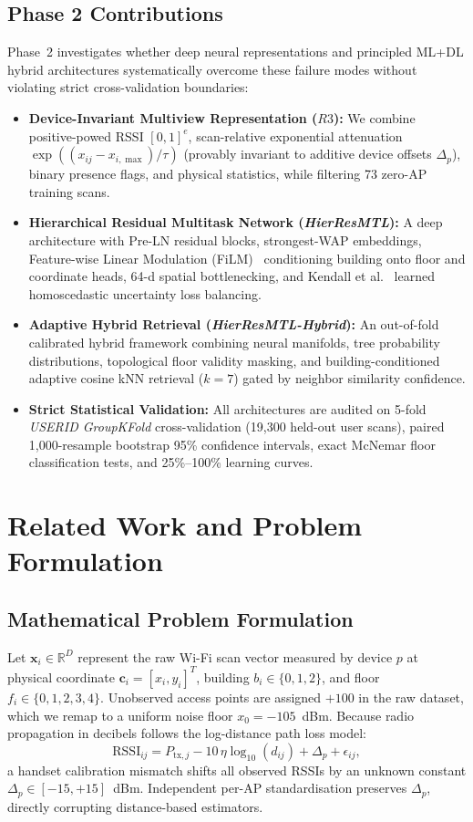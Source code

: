 \documentclass[conference]{IEEEtran}
\begin{document}
\subsection{Phase 2 Contributions}
Phase~2 investigates whether deep neural representations and principled ML+DL hybrid architectures systematically overcome these failure modes without violating strict cross-validation boundaries:
\begin{itemize}
    \item \textbf{Device-Invariant Multiview Representation ($R3$):} We combine positive-powed RSSI $[0, 1]^e$, scan-relative exponential attenuation $\exp((x_{ij} - x_{i,\max})/\tau)$ (provably invariant to additive device offsets $\Delta_p$), binary presence flags, and physical statistics, while filtering 73 zero-AP training scans.
    \item \textbf{Hierarchical Residual Multitask Network (\textit{HierResMTL}):} A deep architecture with Pre-LN residual blocks, strongest-WAP embeddings, Feature-wise Linear Modulation (FiLM)~\cite{perez2018film} conditioning building onto floor and coordinate heads, 64-d spatial bottlenecking, and Kendall et al.~\cite{kendall2018multi} learned homoscedastic uncertainty loss balancing.
    \item \textbf{Adaptive Hybrid Retrieval (\textit{HierResMTL-Hybrid}):} An out-of-fold calibrated hybrid framework combining neural manifolds, tree probability distributions, topological floor validity masking, and building-conditioned adaptive cosine kNN retrieval ($k=7$) gated by neighbor similarity confidence.
    \item \textbf{Strict Statistical Validation:} All architectures are audited on 5-fold \textit{USERID GroupKFold} cross-validation (19,300 held-out user scans), paired 1,000-resample bootstrap 95\% confidence intervals, exact McNemar floor classification tests, and 25\%--100\% learning curves.
\end{itemize}

\section{Related Work and Problem Formulation}

\subsection{Mathematical Problem Formulation}
Let $\mathbf{x}_i \in \mathbb{R}^{D}$ represent the raw Wi-Fi scan vector measured by device $p$ at physical coordinate $\mathbf{c}_i = [x_i, y_i]^T$, building $b_i \in \{0, 1, 2\}$, and floor $f_i \in \{0, 1, 2, 3, 4\}$. Unobserved access points are assigned $+100$ in the raw dataset, which we remap to a uniform noise floor $x_0 = -105$~dBm. Because radio propagation in decibels follows the log-distance path loss model:
\begin{equation}
\text{RSSI}_{ij} = P_{\text{tx}, j} - 10\,\eta\log_{10}(d_{ij}) + \Delta_p + \epsilon_{ij},
\end{equation}
a handset calibration mismatch shifts all observed RSSIs by an unknown constant $\Delta_p \in [-15, +15]$~dBm. Independent per-AP standardisation preserves $\Delta_p$, directly corrupting distance-based estimators.
\end{document}
